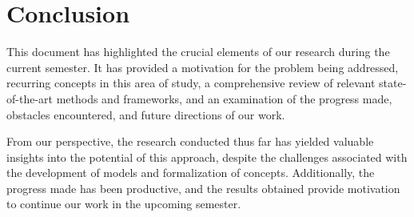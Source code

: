 \chapter{Conclusion}
\label{chapter:conclusion}

This document has highlighted the crucial elements of our research during the
current semester. It has provided a motivation for the problem being addressed,
recurring concepts in this area of study, a comprehensive review of relevant
state-of-the-art methods and frameworks, and an examination of the progress made,
obstacles encountered, and future directions of our work.

From our perspective, the research conducted thus far has yielded valuable
insights into the potential of this approach, despite the challenges associated
with the development of models and formalization of concepts. Additionally, the
progress made has been productive, and the results obtained provide motivation
to continue our work in the upcoming semester.
